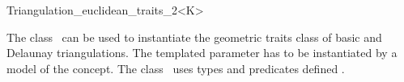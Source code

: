 

\begin{ccRefClass}{Triangulation_euclidean_traits_2<K>}  %

\ccDefinition
  
The class \ccRefName\ can be used to instantiate the geometric traits
class of basic and Delaunay triangulations.
The templated parameter  has to
be instantiated by a model of the  concept.
The class \ccRefName\  uses types 
and predicates defined .



\ccIsModel 

 \\


\ccSeeAlso
{} \\
 \\
\\
 \\
 \\


\end{ccRefClass}


